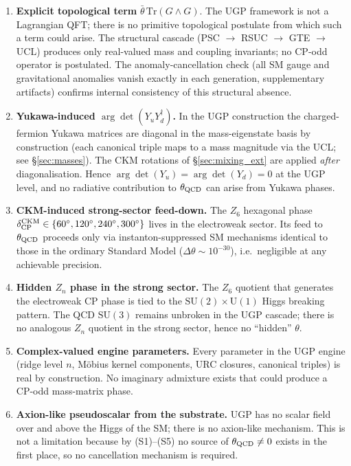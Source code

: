 \documentclass[11pt]{article}
\theoremstyle{remark}
\begin{document}
\begin{sloppypar}
\begin{enumerate}[leftmargin=1.4em,itemsep=0.15em,label=\textbf{(S\arabic*)}]
  \item \textbf{Explicit topological term} $\bar\theta\,\mathrm{Tr}(G \wedge G)$.  The UGP framework is not a Lagrangian QFT; there is no primitive topological postulate from which such a term could arise.  The structural cascade (PSC $\to$ RSUC $\to$ GTE $\to$ UCL) produces only real-valued mass and coupling invariants; no CP-odd operator is postulated.  The anomaly-cancellation check (all SM gauge and gravitational anomalies vanish exactly in each generation, supplementary artifacts) confirms internal consistency of this structural absence.
  \item \textbf{Yukawa-induced $\arg\det(Y_u Y_d^\dagger)$.}  In the UGP construction the charged-fermion Yukawa matrices are diagonal in the mass-eigenstate basis by construction (each canonical triple maps to a mass magnitude via the UCL; see \S\ref{sec:masses}).  The CKM rotations of \S\ref{sec:mixing_ext} are applied \emph{after} diagonalisation.  Hence $\arg\det(Y_u) = \arg\det(Y_d) = 0$ at the UGP level, and no radiative contribution to $\theta_{\rm QCD}$ can arise from Yukawa phases.
  \item \textbf{CKM-induced strong-sector feed-down.}  The $Z_6$ hexagonal phase $\delta_{\rm CP}^{\rm CKM} \in \{60^\circ, 120^\circ, 240^\circ, 300^\circ\}$ lives in the electroweak sector.  Its feed to $\theta_{\rm QCD}$ proceeds only via instanton-suppressed SM mechanisms identical to those in the ordinary Standard Model ($\Delta\theta \sim 10^{-30}$), i.e.\ negligible at any achievable precision.
  \item \textbf{Hidden $Z_n$ phase in the strong sector.}  The $Z_6$ quotient that generates the electroweak CP phase is tied to the $\mathrm{SU}(2) \times \mathrm{U}(1)$ Higgs breaking pattern.  The QCD $\mathrm{SU}(3)$ remains unbroken in the UGP cascade; there is no analogous $Z_n$ quotient in the strong sector, hence no ``hidden'' $\theta$.
  \item \textbf{Complex-valued engine parameters.}  Every parameter in the UGP engine (ridge level $n$, M\"obius kernel components, URC closures, canonical triples) is real by construction.  No imaginary admixture exists that could produce a CP-odd mass-matrix phase.
  \item \textbf{Axion-like pseudoscalar from the substrate.}  UGP has no scalar field over and above the Higgs of the SM; there is no axion-like mechanism.  This is not a limitation because by (S1)--(S5) no source of $\theta_{\rm QCD} \ne 0$ exists in the first place, so no cancellation mechanism is required.
\end{enumerate}
\end{sloppypar}
\end{document}

